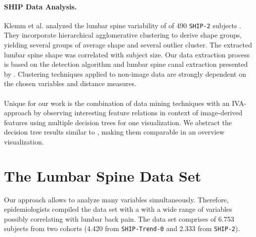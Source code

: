 \documentclass[a4paper,twoside]{style/article}
\begin{document}
\paragraph{SHIP Data Analysis.}
Klemm et al. analyzed the lumbar spine variability of of 490 \texttt{SHIP-2} subjects \cite{Klemm2013VMV}.
They incorporate hierarchical agglomerative clustering to derive shape groups, yielding several groups of average shape and several outlier cluster.
The extracted lumbar spine shape was correlated with subject size.
Our data extraction process is based on the detection algorithm and lumbar spine canal extraction presented by \cite{Klemm2013VMV}.
Clustering techniques applied to non-image data are strongly dependent on the chosen variables and distance measures.
\\\\
Unique for our work is the combination of data mining techniques with an IVA-approach by observing interesting feature relations in context of image-derived features using multiple decision trees for one visualization.
We abstract the decision tree results similar to \cite{Turkay}, making them comparable in an overview visualization.
\section{The Lumbar Spine Data Set}
\label{sec:MaterialsAndMethod}
\noindent Our approach allows to analyze many variables simultaneously.
Therefore, epidemiologists compiled the data set with a with a wide range of variables possibly correlating with lumbar back pain.
The data set comprises of 6.753 subjects from two cohorts (4.420 from \texttt{SHIP-Trend-0} and 2.333 from \texttt{SHIP-2}).

\end{document}
